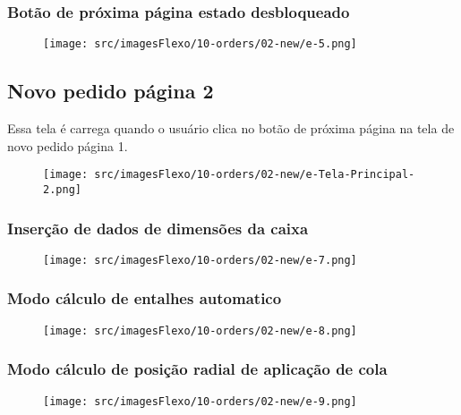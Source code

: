 \newpage
\thispagestyle{fancy}
\vspace*{\fill}
\subsubsection{\small{Botão de próxima página estado desbloqueado}}
\begin{figure}[h]
  \centering
  \texttt{[image: src/imagesFlexo/10-orders/02-new/e-5.png]}
\end{figure}
\vspace*{\fill}

\newpage
\thispagestyle{fancy}
\vspace*{\fill}
\subsection{Novo pedido página 2}
Essa tela é carrega quando o usuário clica no botão de próxima página na tela de novo pedido página 1.
\begin{figure}[h]
  \centering
  \texttt{[image: src/imagesFlexo/10-orders/02-new/e-Tela-Principal-2.png]}
\end{figure}

\newpage
\thispagestyle{fancy}
\vspace*{\fill}
\subsubsection{\small{Inserção de dados de dimensões da caixa}}
\begin{figure}[h]
  \centering
  \texttt{[image: src/imagesFlexo/10-orders/02-new/e-7.png]}
\end{figure}
\vspace*{\fill}

\newpage
\thispagestyle{fancy}
\vspace*{\fill}
\subsubsection{\small{Modo cálculo de entalhes automatico}}
\begin{figure}[h]
  \centering
  \texttt{[image: src/imagesFlexo/10-orders/02-new/e-8.png]}
\end{figure}
\vspace*{\fill}

\newpage
\thispagestyle{fancy}
\vspace*{\fill}
\subsubsection{\small{Modo cálculo de posição	radial de aplicação de cola}}
\begin{figure}[h]
  \centering
  \texttt{[image: src/imagesFlexo/10-orders/02-new/e-9.png]}
\end{figure}
\vspace*{\fill}


